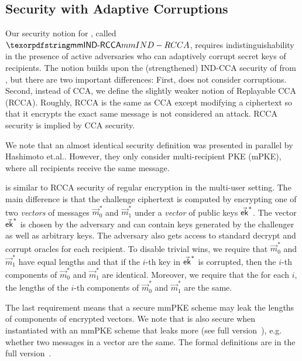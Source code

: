 \subsection{Security with Adaptive Corruptions}
Our security notion for \mmPKE, called $\mmindrcca$, requires indistinguishability in the presence of active adversaries who can adaptively corrupt secret keys of recipients. The notion builds upon the (strengthened) IND-CCA security of \mmPKE from \cite{ASIACCS:PinPoeSch14}, but there are two important differences: First, \cite{ASIACCS:PinPoeSch14} does not consider corruptions. Second, instead of CCA, we define the slightly weaker notion of Replayable CCA (RCCA). Roughly, RCCA \cite{C:CanKraNie03} is the same as CCA except modifying a ciphertext so that it encrypts the exact same message is not considered an attack. RCCA security is implied by CCA security.

We note that an almost identical security definition was presented in parallel by Hashimoto
et.al.\cite{hashimoto2021cmpke}. However, they only consider multi-recipient PKE (mPKE), where all
recipients receive the same message.

\mmindrcca is similar to
RCCA security of regular encryption in the multi-user setting. The main difference is that the challenge ciphertext is computed by encrypting one of two \emph{vectors} of messages $\vec m_0^*$ and $\vec m_1^*$ under a \emph{vector} of public keys $\vec{{\mathsf{ek}}}^*$.
The vector $\vec{{\mathsf{ek}}}^*$ is chosen by the adversary and can contain keys generated by the challenger as well as
arbitrary keys. The adversary also gets access to standard decrypt and corrupt oracles for each recipient.
%
To disable trivial wins, we require that  $\vec m_0^*$ and $\vec m_1^*$ have equal lengths and that if the $i$-th key in $\vec{{\mathsf{ek}}}^*$ is corrupted, then the $i$-th components of $\vec m_0^*$ and $\vec m_1^*$ are identical. Moreover, we require that the for each $i$, the lengths of the $i$-th components of  $\vec m_0^*$ and $\vec m_1^*$ are the same.

The last requirement means that a secure mmPKE scheme may leak the lengths of components of encrypted vectors. We note
that \saik is also secure when instantiated with an mmPKE scheme that leaks more (see full version~\cite{EPRINT:AHKM21}), e.g. whether two messages in a vector are the same.
%
%
%
The formal definitions are in the full version~\cite{EPRINT:AHKM21}.

